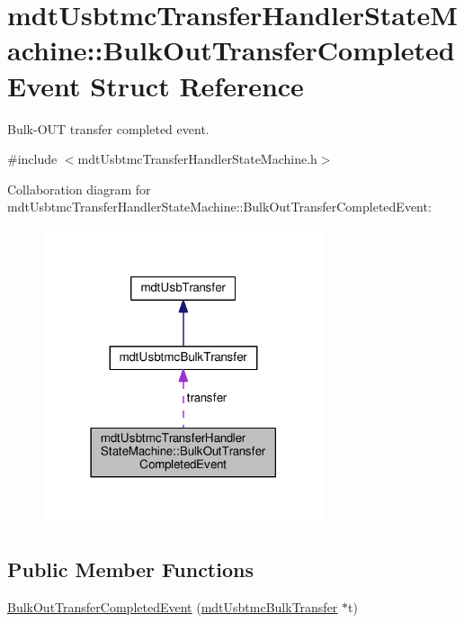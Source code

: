 \hypertarget{structmdt_usbtmc_transfer_handler_state_machine_1_1_bulk_out_transfer_completed_event}{\section{mdt\-Usbtmc\-Transfer\-Handler\-State\-Machine\-:\-:Bulk\-Out\-Transfer\-Completed\-Event Struct Reference}
\label{structmdt_usbtmc_transfer_handler_state_machine_1_1_bulk_out_transfer_completed_event}
}


Bulk-\/\-O\-U\-T transfer completed event.  




{\ttfamily \#include $<$mdt\-Usbtmc\-Transfer\-Handler\-State\-Machine.\-h$>$}



Collaboration diagram for mdt\-Usbtmc\-Transfer\-Handler\-State\-Machine\-:\-:Bulk\-Out\-Transfer\-Completed\-Event\-:
\nopagebreak
\begin{figure}[H]
\begin{center}
\leavevmode
\includegraphics[width=234pt]{structmdt_usbtmc_transfer_handler_state_machine_1_1_bulk_out_transfer_completed_event__coll__graph}
\end{center}
\end{figure}
\subsection*{Public Member Functions}
\begin{DoxyCompactItemize}
\item 
\hyperlink{structmdt_usbtmc_transfer_handler_state_machine_1_1_bulk_out_transfer_completed_event_a05c7b65a448169627134c8b3d63edc9e}{Bulk\-Out\-Transfer\-Completed\-Event} (\hyperlink{classmdt_usbtmc_bulk_transfer}{mdt\-Usbtmc\-Bulk\-Transfer} $\ast$t)
\end{DoxyCompactItemize}

